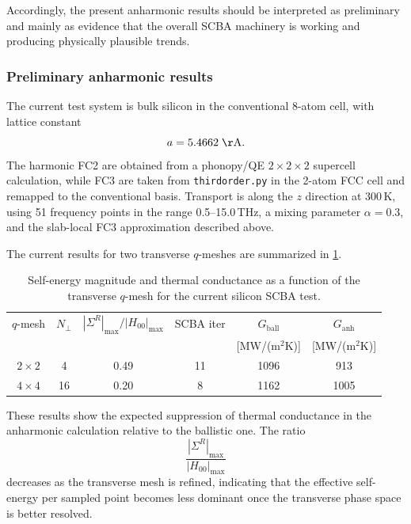 Accordingly, the present anharmonic results should be interpreted as
preliminary and mainly as evidence that the overall SCBA machinery is
working and producing physically plausible trends.

\subsubsection{Preliminary anharmonic results}
\label{sec:anharmonic_results}

The current test system is bulk silicon in the conventional 8-atom
cell, with lattice constant
\begin{equation}
  a = 5.4662\;\mathrm{\AA}.
\end{equation}
The harmonic FC2 are obtained from a phonopy/QE
$2\times2\times2$ supercell calculation, while FC3 are taken from
\texttt{thirdorder.py} in the 2-atom FCC cell and remapped to the
conventional basis.  Transport is along the $z$ direction at 300\,K,
using 51 frequency points in the range 0.5--15.0\,THz, a mixing
parameter $\alpha=0.3$, and the slab-local FC3 approximation described
above.

The current results for two transverse $q$-meshes are summarized in
\cref{tab:scaling_anh}.
\begin{table}[h]
\centering
\caption{Self-energy magnitude and thermal conductance as a function of
the transverse $q$-mesh for the current silicon SCBA test.}
\label{tab:scaling_anh}
\begin{tabular}{cccccc}
  \toprule
  $q$-mesh & $N_\perp$ &
  $|\Sigma^R|_\mathrm{max}/|H_{00}|_\mathrm{max}$ &
  SCBA iter &
  $G_\mathrm{ball}$ &
  $G_\mathrm{anh}$ \\
  & & & & [MW/(m$^2$K)] & [MW/(m$^2$K)] \\
  \midrule
  $2\times2$ & 4  & 0.49 & 11 & 1096 & 913 \\
  $4\times4$ & 16 & 0.20 & 8  & 1162 & 1005 \\
  \bottomrule
\end{tabular}
\end{table}

These results show the expected suppression of thermal conductance in
the anharmonic calculation relative to the ballistic one.  The ratio
\begin{equation}
  \frac{|\Sigma^R|_\mathrm{max}}{|H_{00}|_\mathrm{max}}
\end{equation}
decreases as the transverse mesh is refined, indicating that the
effective self-energy per sampled point becomes less dominant once the
transverse phase space is better resolved.

